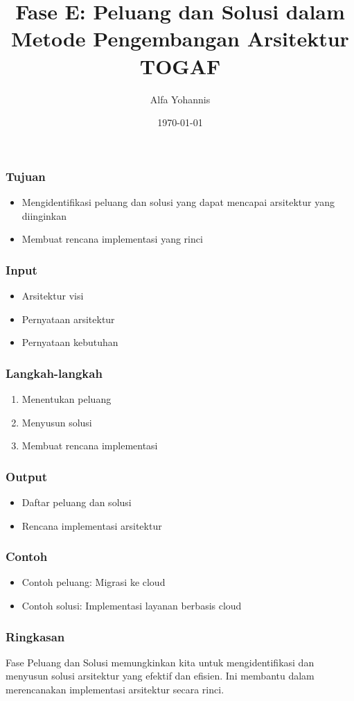 \documentclass{beamer}
\title{Fase E: Peluang dan Solusi dalam Metode Pengembangan Arsitektur TOGAF}
\author{Alfa Yohannis}
\date{\today}
\begin{document}
\frame{\titlepage}

\begin{frame}
\frametitle{Tujuan}
\begin{itemize}
\item Mengidentifikasi peluang dan solusi yang dapat mencapai arsitektur yang diinginkan
\item Membuat rencana implementasi yang rinci
\end{itemize}
\end{frame}

\begin{frame}
\frametitle{Input}
\begin{itemize}
\item Arsitektur visi
\item Pernyataan arsitektur
\item Pernyataan kebutuhan
\end{itemize}
\end{frame}

\begin{frame}
\frametitle{Langkah-langkah}
\begin{enumerate}
\item Menentukan peluang
\item Menyusun solusi
\item Membuat rencana implementasi
\end{enumerate}
\end{frame}

\begin{frame}
\frametitle{Output}
\begin{itemize}
\item Daftar peluang dan solusi
\item Rencana implementasi arsitektur
\end{itemize}
\end{frame}

\begin{frame}
\frametitle{Contoh}
\begin{itemize}
\item Contoh peluang: Migrasi ke cloud
\item Contoh solusi: Implementasi layanan berbasis cloud
\end{itemize}
\end{frame}

\begin{frame}
\frametitle{Ringkasan}
Fase Peluang dan Solusi memungkinkan kita untuk mengidentifikasi dan menyusun solusi arsitektur yang efektif dan efisien. Ini membantu dalam merencanakan implementasi arsitektur secara rinci.
\end{frame}
\end{document}
